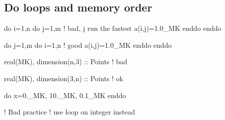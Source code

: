 \documentclass{article}
\begin{document}
\subsection{Do loops and memory order}
\label{sec:do}
\begin{codea}
do i=1,n
    do j=1,m ! bad, j run the fastest
        a(i,j)=1.0_MK
    enddo
enddo
\end{codea} 
\begin{codeb}
do j=1,m
    do i=1,n ! good
        a(i,j)=1.0_MK
    enddo
enddo
\end{codeb}
\begin{codea}
real(MK), dimension(n,3)  :: Points ! bad
\end{codea} 
\begin{codeb}
real(MK), dimension(3,n)  :: Points ! ok
\end{codeb}
\begin{codea}
do x=0._MK, 10._MK, 0.1_MK
enddo
\end{codea} 
\begin{codeb}
! Bad practice
! use loop on integer instead
\end{codeb}



\end{document}

